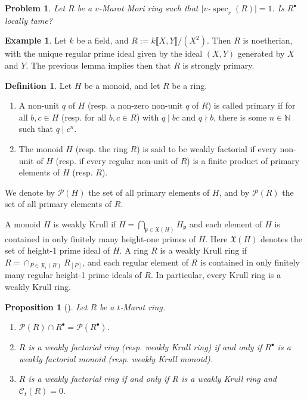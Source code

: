 \documentclass[a4paper, 10pt]{amsart}
\newcommand{\defit}[1]{{\textsf{#1}}}
\theoremstyle{plain}
\newtheorem{proposition}[theorem]{Proposition}
\newtheorem{problem}[theorem]{Problem}
\theoremstyle{definition}
\newtheorem{example}[theorem]{Example}
\newtheorem{definition}[theorem]{Definition}
\theoremstyle{remark}
\DeclareMathOperator{\spec}{spec}
\numberwithin{equation}{section}
\begin{document}
\begin{problem}
    Let $R$ be a $v$-Marot Mori ring such that $|v$-$\spec_r(R)|=1.$ Is $R^\bullet$ locally tame?
\end{problem}
\begin{example}
    Let $k$ be a field, and $R:=k\llbracket X,Y\rrbracket/(X^2)$. Then $R$ is noetherian, with the unique regular prime ideal given by the ideal $(X,Y)$ generated by $X$ and $Y$. The previous lemma implies then that $R$ is strongly primary. 
\end{example}
\begin{definition} Let $H$ be a monoid, and let $R$ be a ring.
    \begin{enumerate}
        \item A non-unit $q$ of $H$ (resp. a non-zero non-unit $q$ of $R$) is called \defit{primary} if for all $b, c \in H$ (resp. for all $b,c\in R$) with $q \mid bc$ and $q \nmid b$, there is some $n \in \mathbb{N}$ such that $q \mid c^n$.
        \item The monoid $H$ (resp. the ring $R$) is said to be \defit{weakly factorial} if every non-unit of $H$ (resp. if every regular non-unit of $R$) is a finite product of primary elements of $H$ (resp. $R$).
    \end{enumerate}  We denote by $\mathcal{P}(H)$ the set of all primary elements of $H$, and by $\mathcal{P}(R)$ the set of all primary elements of $R$.
\end{definition}

A monoid $H$ is \defit{weakly Krull} if $H=\bigcap_{\mathfrak{p}\in \mathfrak{X}(H)}H_\mathfrak{p}$ and each element of $H$ is contained in only finitely many height-one primes of $H$. Here $\mathfrak{X}(H)$ denotes the set of height-1 prime ideal of $H.$  A ring $R$ is a \defit{weakly Krull ring} if $R=\cap_{P\in \mathfrak X_r(R)}R_{[P]}$, and each regular element of $R$ is contained in only finitely many regular height-1 prime ideals of $R.$ In particular, every Krull ring is a weakly Krull ring.

\begin{proposition}[\cite{CO22}]\label{prop: weaklykrull}
Let $R$ be a $t$-Marot ring. 
\begin{enumerate}
    \item $\mathcal{P}(R)\cap R^\bullet =\mathcal{P}(R^{\bullet})$. 
    \item $R$ is a weakly factorial ring \textup(resp. weakly Krull ring\textup) if and only if $R^{\bullet}$ is a weakly factorial monoid \textup(resp. weakly Krull monoid\textup).
    \item $R$ is a weakly factorial ring if and only if $R$ is a weakly Krull ring and $\mathcal{C}_t(R)=0.$
\end{enumerate}
\end{proposition}
\end{document}
